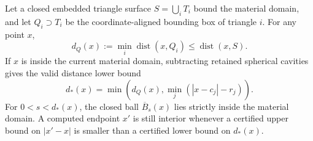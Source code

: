 \begin{proposition}
\label{prop:boxdistance}
Let a closed embedded triangle surface $S=\bigcup_i T_i$ bound the material
domain, and let $Q_i\supset T_i$ be the coordinate-aligned bounding box of
triangle $i$. For any point $x$,
\begin{equation}
 d_Q(x):=\min_i\operatorname{dist}(x,Q_i)
 \le\operatorname{dist}(x,S).
 \label{eq:boxdistance}
\end{equation}
If $x$ is inside the current material domain, subtracting retained spherical
cavities gives the valid distance lower bound
\[
 d_*(x)=\min\left(d_Q(x),\min_j(|x-c_j|-r_j)\right).
\]
For $0<s<d_*(x)$, the closed ball $\overline B_s(x)$ lies strictly inside
the material domain. A computed endpoint $x'$ is still interior whenever
a certified upper bound on $|x'-x|$ is smaller than a certified lower bound
on $d_*(x)$.
\end{proposition}

